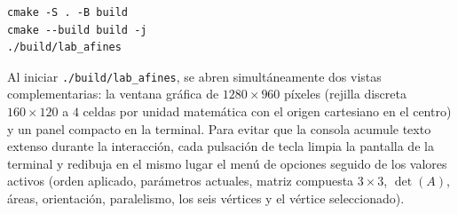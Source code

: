 \documentclass[a4paper,10pt]{article}
\begin{document}
\begin{verbatim}
cmake -S . -B build
cmake --build build -j
./build/lab_afines
\end{verbatim}

Al iniciar \texttt{./build/lab\_afines}, se abren simultáneamente dos vistas complementarias: la ventana gráfica de $1280\times 960$ píxeles (rejilla discreta $160\times 120$ a $4$ celdas por unidad matemática con el origen cartesiano en el centro) y un panel compacto en la terminal. Para evitar que la consola acumule texto extenso durante la interacción, cada pulsación de tecla limpia la pantalla de la terminal y redibuja en el mismo lugar el menú de opciones seguido de los valores activos (orden aplicado, parámetros actuales, matriz compuesta $3\times 3$, $\det(A)$, áreas, orientación, paralelismo, los seis vértices y el vértice seleccionado).
\end{document}
